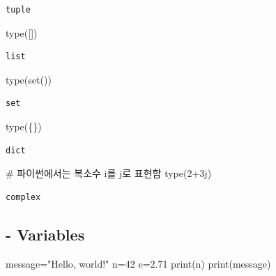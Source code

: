 \documentclass[
  a4paper,
  DIV=11,
  numbers=noendperiod]{scrreprt}
\newenvironment{Shaded}{\begin{snugshade}}{\end{snugshade}}
\newcommand{\BuiltInTok}[1]{\textcolor[rgb]{0.00,0.23,0.31}{#1}}
\newcommand{\CommentTok}[1]{\textcolor[rgb]{0.37,0.37,0.37}{#1}}
\newcommand{\DecValTok}[1]{\textcolor[rgb]{0.68,0.00,0.00}{#1}}
\newcommand{\FloatTok}[1]{\textcolor[rgb]{0.68,0.00,0.00}{#1}}
\newcommand{\NormalTok}[1]{\textcolor[rgb]{0.00,0.23,0.31}{#1}}
\newcommand{\OperatorTok}[1]{\textcolor[rgb]{0.37,0.37,0.37}{#1}}
\newcommand{\OtherTok}[1]{\textcolor[rgb]{0.00,0.23,0.31}{#1}}
\newcommand{\StringTok}[1]{\textcolor[rgb]{0.13,0.47,0.30}{#1}}
\begin{document}
\begin{verbatim}
tuple
\end{verbatim}

\begin{Shaded}
\begin{Highlighting}[]
\BuiltInTok{type}\NormalTok{([])}
\end{Highlighting}
\end{Shaded}

\begin{verbatim}
list
\end{verbatim}

\begin{Shaded}
\begin{Highlighting}[]
\BuiltInTok{type}\NormalTok{(}\BuiltInTok{set}\NormalTok{())}
\end{Highlighting}
\end{Shaded}

\begin{verbatim}
set
\end{verbatim}

\begin{Shaded}
\begin{Highlighting}[]
\BuiltInTok{type}\NormalTok{(\{\})}
\end{Highlighting}
\end{Shaded}

\begin{verbatim}
dict
\end{verbatim}

\begin{Shaded}
\begin{Highlighting}[]
\CommentTok{\# 파이썬에서는 복소수 i를 j로 표현함}
\BuiltInTok{type}\NormalTok{(}\DecValTok{2}\OperatorTok{+}\OtherTok{3j}\NormalTok{)}
\end{Highlighting}
\end{Shaded}

\begin{verbatim}
complex
\end{verbatim}

\subsection{- Variables}\label{variables}

\begin{Shaded}
\begin{Highlighting}[]
\NormalTok{message}\OperatorTok{=}\StringTok{"Hello, world!"}
\NormalTok{n}\OperatorTok{=}\DecValTok{42}
\NormalTok{e}\OperatorTok{=}\FloatTok{2.71}
\BuiltInTok{print}\NormalTok{(n)}
\BuiltInTok{print}\NormalTok{(message)}
\end{Highlighting}
\end{Shaded}
\end{document}

